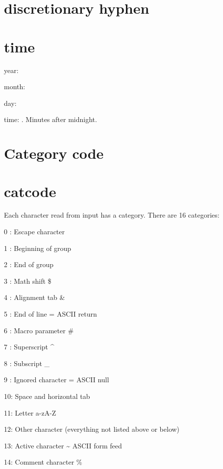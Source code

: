   \section{discretionary hyphen}



\section{time}

  year:  \number\year

  month: \number\month

  day:   \number\day

  time:  \number\time. Minutes after midnight.

\section{Category code}

\section{catcode}

  Each character read from input has a category. There are 16 categories:

  0 : Escape character \bs

  1 : Beginning of group \bo

  2 : End of group \bc

  3 : Math shift \$

  4 : Alignment tab \&

  5 : End of line = ASCII return

  6 : Macro parameter \#

  7 : Superscript \^{}

  8 : Subscript \_

  9 : Ignored character = ASCII null

  10: Space and horizontal tab

  11: Letter a-zA-Z

  12: Other character (everything not listed above or below)

  13: Active character \~{} ASCII form feed

  14: Comment character \%

